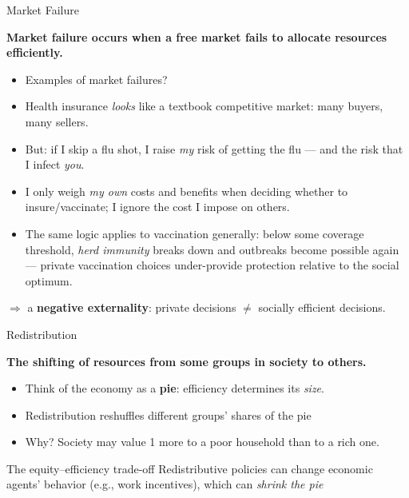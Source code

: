\documentclass[11pt,aspectratio=169]{beamer}
\begin{document}
\begin{frame}{Market Failure}

\textbf{Market failure occurs when a free market fails to allocate resources efficiently.}

\begin{itemize}
	\item Examples of market failures?
\end{itemize}
 \pause
  \begin{itemize}
    \item Health insurance \emph{looks} like a textbook competitive market: many buyers, many sellers.
    \item But: if I skip a flu shot, I raise \emph{my} risk of getting the flu --- and the risk that I infect \emph{you}.
    \item I only weigh \emph{my own} costs and benefits when deciding whether to insure/vaccinate; I ignore the cost I impose on others.
    \item The same logic applies to vaccination generally: below some coverage threshold, \emph{herd immunity} breaks down and outbreaks become possible again --- private vaccination choices under-provide protection relative to the social optimum.
  \end{itemize}
  \vspace{0.5em}
  \centering
  $\Rightarrow$ a \textbf{negative externality}: private decisions $\neq$ socially efficient decisions.
\end{frame}



\begin{frame}{Redistribution}

\textbf{The shifting of resources from some groups in society to others.}

  \begin{itemize}
    \item Think of the economy as a \textbf{pie}: efficiency determines its \emph{size}.
    \item Redistribution reshuffles different groups' shares of the pie
    \item Why? Society may  value \texteuro{}1 more to a poor household than to a rich one.
  \end{itemize}
  \vspace{0.5em}
  \begin{alertblock}{The equity--efficiency trade-off}
  \vspace{0.2cm}
    Redistributive policies can change economic agents' behavior (e.g., work incentives), which can \emph{shrink the pie}
  \end{alertblock}
\end{frame}
\end{document}
